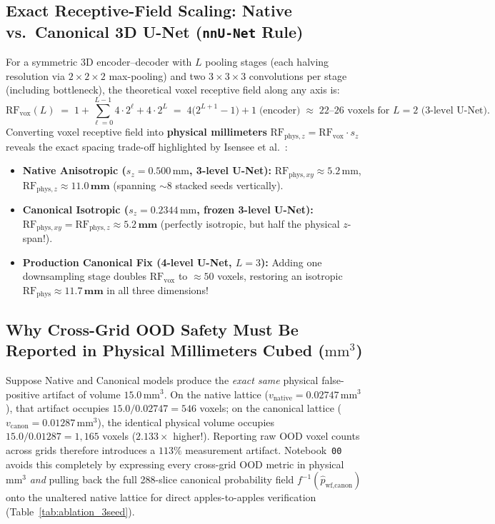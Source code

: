 \documentclass[10pt,a4paper]{article}
\renewcommand{\_}{\origunderscore\allowbreak}
\begin{document}
\subsection{Exact Receptive-Field Scaling: Native vs.\ Canonical 3D U-Net (\texttt{nnU-Net} Rule)}

For a symmetric 3D encoder--decoder with $L$ pooling stages (each halving resolution via $2\times 2\times 2$ max-pooling) and two $3\times 3\times 3$ convolutions per stage (including bottleneck), the theoretical voxel receptive field along any axis is:
\begin{equation}
    \text{RF}_{\text{vox}}(L) \;=\; 1 + \sum_{\ell=0}^{L-1} 4 \cdot 2^\ell + 4 \cdot 2^L \;=\; 4\bigl(2^{L+1} - 1\bigr) + 1 \;\text{(encoder)} \;\approx\; 22\text{--}26\text{ voxels for } L=2 \text{ (3-level U-Net)}.
\end{equation}
Converting voxel receptive field into \textbf{physical millimeters} $\text{RF}_{\text{phys},z} = \text{RF}_{\text{vox}}\cdot s_z$ reveals the exact spacing trade-off highlighted by Isensee et al.~\cite{isensee2021nnunet}:
\begin{itemize}
    \item \textbf{Native Anisotropic ($s_z = 0.500\,\text{mm}$, 3-level U-Net):} $\text{RF}_{\text{phys},xy} \approx 5.2\,\text{mm}$, $\text{RF}_{\text{phys},z} \approx \mathbf{11.0\,\text{mm}}$ (spanning $\sim 8$ stacked seeds vertically).
    \item \textbf{Canonical Isotropic ($s_z = 0.2344\,\text{mm}$, frozen 3-level U-Net):} $\text{RF}_{\text{phys},xy} = \text{RF}_{\text{phys},z} \approx \mathbf{5.2\,\text{mm}}$ (perfectly isotropic, but half the physical $z$-span!).
    \item \textbf{Production Canonical Fix (4-level U-Net, $L=3$):} Adding one downsampling stage doubles $\text{RF}_{\text{vox}}$ to $\approx 50$ voxels, restoring an isotropic $\text{RF}_{\text{phys}} \approx \mathbf{11.7\,\text{mm}}$ in all three dimensions!
\end{itemize}

\subsection{Why Cross-Grid OOD Safety Must Be Reported in Physical Millimeters Cubed ($\text{mm}^3$)}

Suppose Native and Canonical models produce the \emph{exact same} physical false-positive artifact of volume $15.0\,\text{mm}^3$. On the native lattice ($v_{\text{native}} = 0.02747\,\text{mm}^3$), that artifact occupies $15.0 / 0.02747 = 546$ voxels; on the canonical lattice ($v_{\text{canon}} = 0.01287\,\text{mm}^3$), the identical physical volume occupies $15.0 / 0.01287 = 1{,}165$ voxels ($2.133\times$ higher!). Reporting raw OOD voxel counts across grids therefore introduces a $113\%$ measurement artifact. Notebook~\texttt{00} avoids this completely by expressing every cross-grid OOD metric in physical $\text{mm}^3$ \emph{and} pulling back the full 288-slice canonical probability field $f^{-1}(\hat{p}_{\text{wf,canon}})$ onto the unaltered native lattice for direct apples-to-apples verification (Table~\ref{tab:ablation_3seed}).
\end{document}

